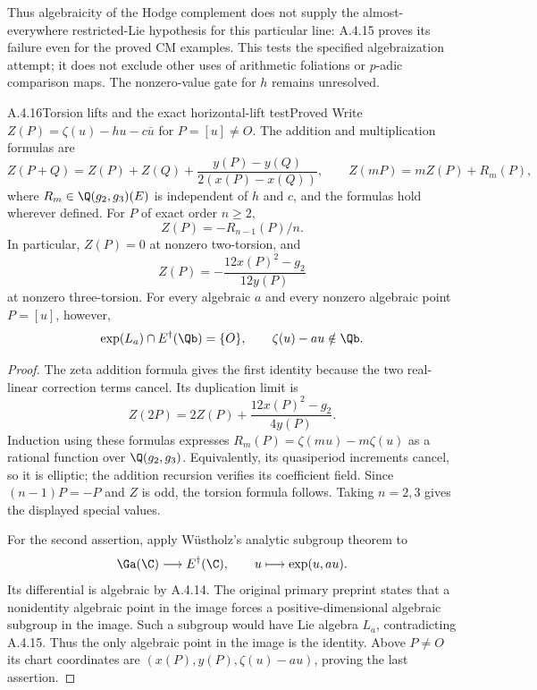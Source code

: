 Thus algebraicity of the Hodge complement does not supply the almost-everywhere restricted-Lie hypothesis for this particular line: A.4.15 proves its failure even for the proved CM examples. This tests the specified algebraization attempt; it does not exclude other uses of arithmetic foliations or $p$-adic comparison maps. The nonzero-value gate for $h$ remains unresolved.

\begin{result}{A.4.16}{Torsion lifts and the exact horizontal-lift test}{Proved}
Write $Z(P)=\zeta(u)-hu-c\bar u$ for $P=[u]\ne O$. The addition and multiplication formulas are
\[
 Z(P+Q)=Z(P)+Z(Q)+\frac{y(P)-y(Q)}{2(x(P)-x(Q))},
 \qquad Z(mP)=mZ(P)+R_m(P),
\]
where $R_m\in\Q(g_2,g_3)(E)$ is independent of $h$ and $c$, and the formulas hold wherever defined. For $P$ of exact order $n\ge2$,
\[
 Z(P)=-R_{n-1}(P)/n.
\]
In particular, $Z(P)=0$ at nonzero two-torsion, and
\[
 Z(P)=-\frac{12x(P)^2-g_2}{12y(P)}
\]
at nonzero three-torsion. For every algebraic $a$ and every nonzero algebraic point $P=[u]$, however,
\[
 \exp(L_a)\cap E^\dagger(\Qb)=\{O\},\qquad
 \zeta(u)-au\notin\Qb.
\]
\end{result}
\begin{proof}
The zeta addition formula gives the first identity because the two real-linear correction terms cancel. Its duplication limit is
\[
 Z(2P)=2Z(P)+\frac{12x(P)^2-g_2}{4y(P)}.
\]
Induction using these formulas expresses $R_m(P)=\zeta(mu)-m\zeta(u)$ as a rational function over $\Q(g_2,g_3)$. Equivalently, its quasiperiod increments cancel, so it is elliptic; the addition recursion verifies its coefficient field. Since $(n-1)P=-P$ and $Z$ is odd, the torsion formula follows. Taking $n=2,3$ gives the displayed special values.

For the second assertion, apply W\"ustholz's analytic subgroup theorem to
\[
 \Ga(\C)\longrightarrow E^\dagger(\C),\qquad
 u\longmapsto\exp(u,au).
\]
Its differential is algebraic by A.4.14. The original primary preprint \cite[Hauptsatz and Bemerkung 2, printed p.3]{EllWustholz1984} states that a nonidentity algebraic point in the image forces a positive-dimensional algebraic subgroup in the image. Such a subgroup would have Lie algebra $L_a$, contradicting A.4.15. Thus the only algebraic point in the image is the identity. Above $P\ne O$ its chart coordinates are $(x(P),y(P),\zeta(u)-au)$, proving the last assertion.
\end{proof}

